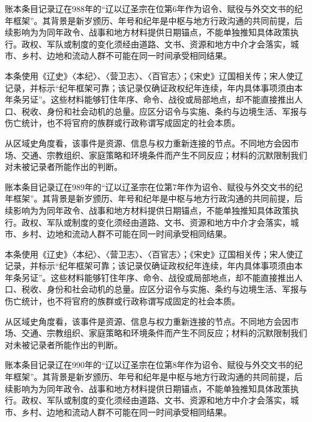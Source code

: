 账本条目记录辽在988年的“辽以辽圣宗在位第6年作为诏令、赋役与外交文书的纪年框架”。其背景是新岁颁历、年号和纪年是中枢与地方行政沟通的共同前提，后续影响为为同年政令、战事和地方材料提供日期锚点，不能单独推知具体政策执行。政权、军队或制度的变化须经由道路、文书、资源和地方中介才会落实，城市、乡村、边地和流动人群不可能在同一时间承受相同结果。

本条使用《辽史》〈本纪〉、〈营卫志〉、〈百官志〉；《宋史》辽国相关传；宋人使辽记录，并标示“纪年框架可靠；该记录仅确证政权纪年连续，年内具体事项须由本年条另证”。这些材料能够钉住年序、命令、战役或局部地点，却不能直接推出人口、税收、身份和社会动机的总量。应区分诏令与实施、条约与边境生活、军报与伤亡统计，也不将官府的族群或行政称谓写成固定的社会本质。

从区域史角度看，该事件是资源、信息与权力重新连接的节点。不同地方会因市场、交通、宗教组织、家庭策略和环境条件而产生不同反应；材料的沉默限制我们对未被记录者所能作出的判断。

账本条目记录辽在989年的“辽以辽圣宗在位第7年作为诏令、赋役与外交文书的纪年框架”。其背景是新岁颁历、年号和纪年是中枢与地方行政沟通的共同前提，后续影响为为同年政令、战事和地方材料提供日期锚点，不能单独推知具体政策执行。政权、军队或制度的变化须经由道路、文书、资源和地方中介才会落实，城市、乡村、边地和流动人群不可能在同一时间承受相同结果。

本条使用《辽史》〈本纪〉、〈营卫志〉、〈百官志〉；《宋史》辽国相关传；宋人使辽记录，并标示“纪年框架可靠；该记录仅确证政权纪年连续，年内具体事项须由本年条另证”。这些材料能够钉住年序、命令、战役或局部地点，却不能直接推出人口、税收、身份和社会动机的总量。应区分诏令与实施、条约与边境生活、军报与伤亡统计，也不将官府的族群或行政称谓写成固定的社会本质。

从区域史角度看，该事件是资源、信息与权力重新连接的节点。不同地方会因市场、交通、宗教组织、家庭策略和环境条件而产生不同反应；材料的沉默限制我们对未被记录者所能作出的判断。

账本条目记录辽在990年的“辽以辽圣宗在位第8年作为诏令、赋役与外交文书的纪年框架”。其背景是新岁颁历、年号和纪年是中枢与地方行政沟通的共同前提，后续影响为为同年政令、战事和地方材料提供日期锚点，不能单独推知具体政策执行。政权、军队或制度的变化须经由道路、文书、资源和地方中介才会落实，城市、乡村、边地和流动人群不可能在同一时间承受相同结果。

